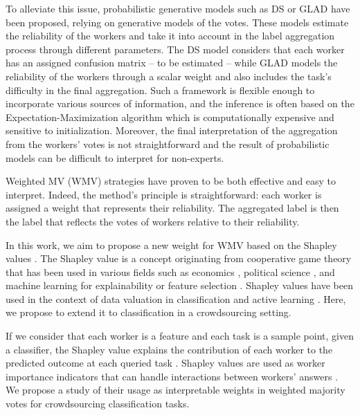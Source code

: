 \documentclass{cap2024}
\begin{document}
To alleviate this issue, probabilistic generative models such as DS \citep{dawid_maximum_1979} or GLAD \citep{whitehill_whose_2009} have been proposed, relying on generative models of the votes.
These models estimate the reliability of the workers and take it into account in the label aggregation process through different parameters. The DS model considers that each worker has an assigned confusion matrix -- to be estimated -- while GLAD models the reliability of the workers through a scalar weight and also includes the task's difficulty in the final aggregation.
Such a framework is flexible enough to incorporate various sources of information, and the inference is often based on the Expectation-Maximization algorithm which is computationally expensive and sensitive to initialization.
Moreover, the final interpretation of the aggregation from the workers' votes is not straightforward and the result of probabilistic models can be difficult to interpret for non-experts.

Weighted MV (WMV) strategies \citep{appen_wawa_2021,karger2011iterative,ma2020adversarial} have proven to be both effective and easy to interpret. Indeed, the method's principle is straightforward: each worker is assigned a weight that represents their reliability. The aggregated label is then the label that reflects the votes of workers relative to their reliability.

In this work, we aim to propose a new weight for WMV based on the Shapley values \citep{shapley1953value}.
The Shapley value is a concept originating from cooperative game theory that has been used in various fields such as economics \citep{aumann1994economic}, political science \citep{engelbrecht2009use}, and machine learning for explainability \citep{lundberg2017unified} or feature selection \citep{cohen2007feature}.
Shapley values have been used in the context of data valuation in classification \citep{schoch2022cs} and active learning \citep{ghorbani2022data}. Here, we propose to extend it to classification in a crowdsourcing setting.

If we consider that each worker is a feature and each task is a sample point, given a classifier, the Shapley value explains the contribution of each worker to the predicted outcome at each queried task \citep{molnar2020interpretable}.
Shapley values are used as worker importance indicators that can handle interactions between workers' answers \citep{owen2017shapley,lundberg2017unified}.
We propose a study of their usage as interpretable weights in weighted majority votes for crowdsourcing classification tasks.
\end{document}
